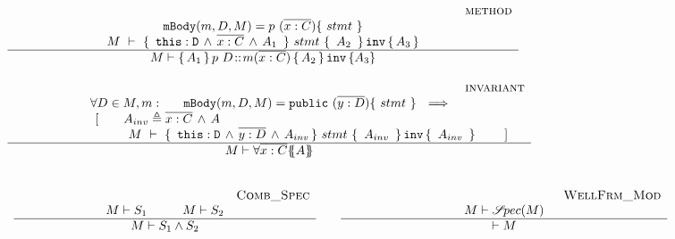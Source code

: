 {$
\begin{array}{l}
\inferruleSD 
{~ \strut \hspace{6.5cm} {\sc{method}}}
{  
 \prg{mBody}(m,D,M)=p \ (\overline{x:C})\{\  stmt \ \}  %
    \\
  {\hprovesN{M} { \ \prg{this}:\prg{D}\, \wedge\, \overline{x:C}\, \wedge\, A_1\  } {\ stmt\ } {\ A_2 \ }   {A_3} } 
}
{
M \vdash {\mprepostN {A_1}{p\ D}{m}{x}{C}{A_2} {A_3} }
}
\\
\\
\inferruleSD 
{~ \strut \hspace{6.5cm} {\sc{invariant}}}
{  
\forall  D\in M,  m:\ \ \  \ \  \prg{mBody}(m,D,M)=\prg{public} \ (\overline{y:D})\{\  stmt \ \}      \ \ \Longrightarrow  
    \\
    \begin{array}{l}
   ~ \strut \hspace{1.7cm}[ \ \ \ \  \ \ A_{inv} \triangleq \overline{x:C}\, \wedge\, A
  \\
  ~ \strut \hspace{1.7cm} \ \ \ \ \  \ \ \  {\hprovesN{M} { \ \prg{this}:\prg{D}\, \wedge\, \overline{y:D}\, \wedge\,  A_{inv} } {\ stmt\ } {\ A_{inv}\ } {\ A_{inv} \ }  } \ \ \ \ \  \ \ ]
\end{array}
}
{
M \vdash \TwoStatesN{ \overline{x:C}} {A}
}
\\
\\
\\
\begin{array}{lcl}
\inferruleSD 
{~ \strut   {\sc{Comb\_Spec}}}
{  
M \vdash S_1 \hspace{1cm}  M \vdash S_2
}
{
M \vdash S_1 \wedge S_2
}
& &
\inferruleSD 
{~ \strut  {\sc{WellFrm\_Mod}}}
{  M \vdash \SpecOf {M}
}
{
\vdash M  
}
\end{array}
\end{array}
$
 
}
